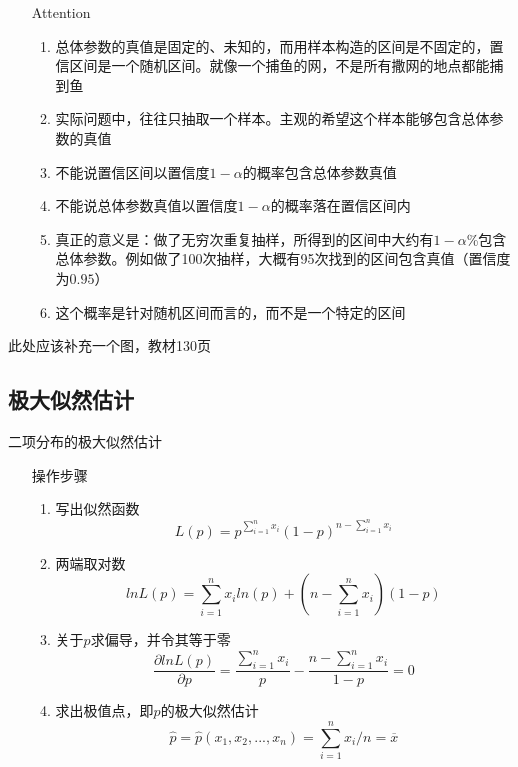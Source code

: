 \documentclass[UTF8,10pt]{book}
\begin{document}
            {\kaishu

                 \begin{itemize}
                    \item [Attention] {
                        \begin{enumerate}
                            \item 总体参数的真值是固定的、未知的，而用样本构造的区间是不固定的，置信区间是一个随机区间。就像一个捕鱼的网，不是所有撒网的地点都能捕到鱼
                            \item 实际问题中，往往只抽取一个样本。主观的希望这个样本能够包含总体参数的真值
                            \item 不能说置信区间以置信度$1-\alpha$的概率包含总体参数真值
                            \item 不能说总体参数真值以置信度$1-\alpha$的概率落在置信区间内
                            \item 真正的意义是：做了无穷次重复抽样，所得到的区间中大约有$1-\alpha$\%包含总体参数。例如做了100次抽样，大概有95次找到的区间包含真值（置信度为$0.95$）
                            \item 这个概率是针对随机区间而言的，而不是一个特定的区间
                        \end{enumerate}
                    }
                \end{itemize}
			}
            此处应该补充一个图，教材130页

        \subsection{极大似然估计}

                二项分布的极大似然估计

            \begin{itemize}
                \item [操作步骤] {
                    \begin{enumerate}
                        \item 写出似然函数 $$ L(p) =  p^{\sum_{i=1}^n x_i} \left(1-p \right)^{n-\sum_{i=1}^n x_i}$$
                        \item 两端取对数  $$ lnL(p) = \sum_{i=1}^n x_i  ln(p) + \left(n-\sum_{i=1}^n x_i \right) \left(1-p \right)$$
                        \item 关于$p$求偏导，并令其等于零 $$ \frac{\partial lnL(p)}{\partial p} = \frac{\sum_{i=1}^n x_i}{p} - \frac{n-\sum_{i=1}^n x_i}{1-p} =0$$
                        \item 求出极值点，即$p$的极大似然估计 $$ \hat{p} = \hat{p} (x_1,x_2,...,x_n) = \sum_{i=1}^n x_i / n =\overline{x} $$
                        
                    \end{enumerate}
                }
            \end{itemize}
\end{document}
